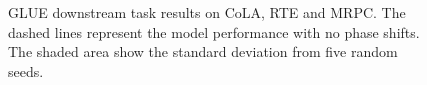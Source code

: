 \begin{figure}
    \centering
    \caption{GLUE downstream task results on CoLA, RTE and MRPC. The dashed lines represent the model performance with no phase shifts. The shaded area show the standard deviation from five random seeds.}
    \label{fig:glue_eval}
\end{figure}